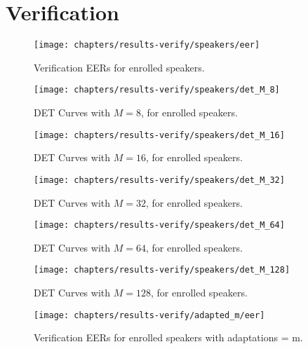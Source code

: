 \chapter{Verification}
\label{apx:results-verify}



\begin{figure}[ht]
	\centering
	\texttt{[image: chapters/results-verify/speakers/eer]}
	\caption{Verification EERs for enrolled speakers.}
	\label{fig:results-verify}
\end{figure}

\begin{figure}[ht]
	\centering
	\texttt{[image: chapters/results-verify/speakers/det\_M\_8]}
	\caption{DET Curves with $M = 8$, for enrolled speakers.}
	\label{fig:results-verify-M_8}
\end{figure}

\begin{figure}[ht]
	\centering
	\texttt{[image: chapters/results-verify/speakers/det\_M\_16]}
	\caption{DET Curves with $M = 16$, for enrolled speakers.}
	\label{fig:results-verify-M_16}
\end{figure}

\begin{figure}[ht]
	\centering
	\texttt{[image: chapters/results-verify/speakers/det\_M\_32]}
	\caption{DET Curves with $M = 32$, for enrolled speakers.}
	\label{fig:results-verify-M_32}
\end{figure}

\begin{figure}[ht]
	\centering
	\texttt{[image: chapters/results-verify/speakers/det\_M\_64]}
	\caption{DET Curves with $M = 64$, for enrolled speakers.}
	\label{fig:results-verify-M_64}
\end{figure}

\clearpage
\begin{figure}[ht]
	\centering
	\texttt{[image: chapters/results-verify/speakers/det\_M\_128]}
	\caption{DET Curves with $M = 128$, for enrolled speakers.}
	\label{fig:results-verify-M_128}
\end{figure}

\newpage


\begin{figure}[ht]
	\centering
	\texttt{[image: chapters/results-verify/adapted\_m/eer]}
	\caption{Verification EERs for enrolled speakers with adaptations = m.}
	\label{fig:results-verify-adapted_m}
\end{figure}

